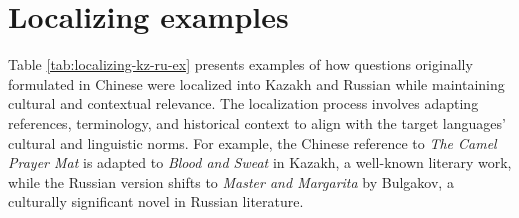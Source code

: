 
\onecolumn
\appendix
\clearpage
\section{Localizing examples}
\label{localizing_examples}
Table \ref{tab:localizing-kz-ru-ex} presents examples of how questions originally formulated in Chinese were localized into Kazakh and Russian while maintaining cultural and contextual relevance. The localization process involves adapting references, terminology, and historical context to align with the target languages' cultural and linguistic norms. For example, the Chinese reference to \textit{The Camel Prayer Mat} is adapted to \textit{Blood and Sweat} in Kazakh, a well-known literary work, while the Russian version shifts to \textit{Master and Margarita} by Bulgakov, a culturally significant novel in Russian literature.



\clearpage
